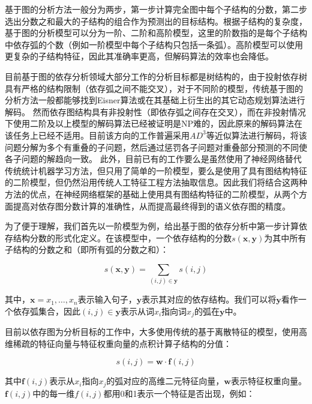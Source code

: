 基于图的分析方法一般分为两步，第一步计算完全图中每个子结构的分数，第二步选出分数之和最大的子结构的组合作为预测出的目标结构。根据子结构的复杂度，基于图的分析模型可以分为一阶、二阶和高阶模型，这里的阶数指的是每个子结构中依存弧的个数（例如一阶模型中每个子结构只包括一条弧）。高阶模型可以使用更复杂的子结构特征，因此其准确率更高，但解码算法的效率也会降低。

目前基于图的依存分析领域大部分工作的分析目标都是树结构的，由于投射依存树具有严格的结构限制（依存弧之间不能交叉），对于不同阶的模型，传统基于图的分析方法一般都能够找到Eisner算法或在其基础上衍生出的其它动态规划算法进行解码。
然而依存图结构具有非投射性（即依存弧之间存在交叉），而在非投射情况下使用二阶及以上模型的解码算法已经被证明是NP难的，因此原来的解码算法在该任务上已经不适用。目前该方向的工作普遍采用$AD^3$等近似算法进行解码，将该问题分解为多个有重叠的子问题，然后通过惩罚各子问题对重叠部分预测的不同使各子问题的解趋向一致。
此外，目前已有的工作要么是虽然使用了神经网络替代传统统计机器学习方法，但只用了简单的一阶模型，要么是使用了具有图结构特征的二阶模型，但仍然沿用传统人工特征工程方法抽取信息。因此我们将结合这两种方法的优点，在神经网络框架的基础上使用具有图结构特征的二阶模型，从两个方面提高对依存图分数计算的准确性，从而提高最终得到的语义依存图的精度。

为了便于理解，我们首先以一阶模型为例，给出基于图的依存分析中第一步计算依存结构分数的形式化定义。在该模型中，一个依存结构的分数$s(\boldsymbol{x},\boldsymbol{y})$为其中所有子结构的分数之和（即所有弧的分数之和）：

\begin{equation}
s(\boldsymbol{x},\boldsymbol{y})=\sum_{(i,j) \in \boldsymbol{y}} s(i,j)
\end{equation}

其中，$\boldsymbol{x}=x_1,\dots,x_n$表示输入句子，$\boldsymbol{y}$表示其对应的依存结构。我们可以将$\boldsymbol{y}$看作一个依存弧集合，因此$(i,j) \in \boldsymbol{y}$表示从词$x_i$指向词$x_j$的弧在$\boldsymbol{y}$中。

目前以依存图为分析目标的工作中，大多使用传统的基于离散特征的模型，使用高维稀疏的特征向量与特征权重向量的点积计算子结构的分值：

\begin{equation}
s(i,j) = \mathbf{w} \cdot \mathbf{f}(i,j)
\end{equation}

其中$\mathbf{f}(i,j)$表示从$x_i$指向$x_j$的弧对应的高维二元特征向量，$\mathbf{w}$表示特征权重向量。$\mathbf{f}(i,j)$中的每一维$f(i,j)$都用0和1表示一个特征是否出现，例如：

